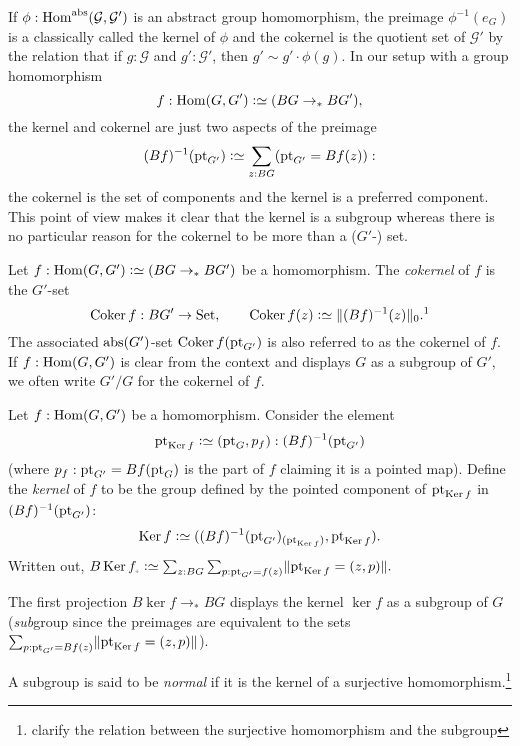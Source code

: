 If $\phi:\Hom^\abstr(\mathcal G,\mathcal G')$ is an abstract group homomorphism, the preimage $\phi^{-1}(e_G)$ is a classically called the kernel of $\phi$ and the cokernel is the quotient set of $\mathcal G'$ by the relation that if $g:\mathcal G$ and $g':\mathcal G'$, then $g'\sim g'\cdot\phi(g)$.  
In our setup with a group homomorphism 
$$f:\Hom(G,G')\defequi(BG\to_*BG'),$$ the kernel and cokernel are just two aspects of the preimage 
$$(Bf)^{-1}(\pt_{G'})\defequi\sum_{z:BG}(\pt_{G'}=Bf(z)):$$
 the cokernel is the set of components and the kernel is a preferred component.  This point of view makes it clear that the kernel is a subgroup whereas there is no particular reason for the cokernel to be more than a ($G'$-) set.
\begin{definition}
  \label{def:cokernel}
  Let $f:\Hom(G,G')\defequi(BG\to_*BG')$  be a homomorphism. %
The \emph{cokernel} of $f$ is the $G'$-set
\[
  \coker f:BG'\to\Set,\qquad \coker f(z)\defequi  \Trunc{(Bf)^{-1}(z)}_0.\text{\footnotemark}
\]
The associated $\mathrm{abs}(G')$-set $\coker f(\pt_{G'})$ is also referred to as the cokernel of $f$.  If $f:\Hom(G,G')$ is clear from the context and displays $G$ as a subgroup of $G'$, we often write $G'/G$ for the cokernel of $f$.  

\end{definition}
\begin{definition}
  \label{def:kernel}
Let $f:\Hom(G,G')$  be a homomorphism.
Consider the element 
$$\pt_{\ker f}\defequi(\pt_G,p_f):(Bf)^{-1}(\pt_{G'})$$ (where $p_f:\mathrm{pt}_{G'}=Bf(\mathrm{pt}_G)$ is the part of $f$ claiming it is a pointed map). 
Define the \emph{kernel}  of $f$ to be the group defined by the pointed component  of $\pt_{\ker f}$ in $(Bf)^{-1}(\mathrm{pt}_{G'})$:
$$\ker f\defequi ((Bf)^{-1}(\pt_{G'})_{(\pt_{\ker f})},\pt_{\ker f}).
$$ 
Written out,
$B\ker f_\div\defequi \sum_{z:BG}\sum_{p:\pt_{G'}=f(z)}\Trunc{\pt_{\ker f}=(z,p)}.$  

The first projection $B\ker f\to_* BG$ displays the kernel $\ker f$ as a subgroup of $G$ (\emph{sub}group since the preimages are equivalent to the sets $\sum_{p:\pt_{G'}=Bf(z)}\Trunc{\pt_{\ker f}=(z,p)}$).  

A subgroup is said to be \emph{normal} if it is the kernel of a surjective homomorphism.\footnote{clarify the relation between the surjective homomorphism and the subgroup}
\end{definition}

